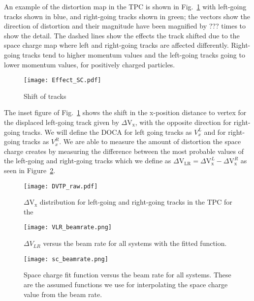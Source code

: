 An example of the distortion map in the TPC is shown in Fig.~\ref{fig:sc_shift} with left-going tracks shown in blue, and right-going tracks shown in green; the vectors show the direction of distortion and their magnitude have been magnified by ??? times to show the detail. The dashed lines show the effects the track shifted due to the space charge map where left and right-going tracks are affected differently. Right-going tracks tend to higher momentum values and the left-going tracks going to lower momentum values, for positively charged particles. 

\begin{figure}[!htb]
\texttt{[image: Effect\_SC.pdf]}
\caption{Shift of tracks}
\label{fig:sc_shift}
\end{figure}

The inset figure of Fig.~\ref{fig:sc_shift} shows the shift in the x-position distance to vertex for the displaced left-going track given by $\Delta\mathrm{V}_\mathrm{x}$, with the opposite direction for right-going tracks. We will define the DOCA for left going tracks as $V_x^L$ and for right-going tracks as $V_x^R$. We are able to measure the amount of distortion the space charge creates by measuring the difference between the most probable values of the left-going and right-going tracks which we define as $\Delta\mathrm{V}_\mathrm{LR} = \Delta\mathrm{V}_\mathrm{x}^L - \Delta\mathrm{V}_\mathrm{x}^R$ as seen in Figure~\ref{fig:VLR}.

\begin{figure}[H]
\texttt{[image: DVTP\_raw.pdf]}
\caption{$\Delta\mathrm{V}_\mathrm{x}$ distribution for left-going and right-going tracks in the TPC for the }
\label{fig:VLR}
\end{figure}


\begin{figure}[!htb]
\texttt{[image: VLR\_beamrate.png]}
\caption{ $\Delta V_{LR}$ versus the beam rate for all systems with the fitted function.}
\label{fig:vlr_br}
\end{figure}



\begin{figure}[!htb]
\texttt{[image: sc\_beamrate.png]}
\caption{Space charge fit function versus the beam rate for all systems. These are the assumed functions we use for interpolating the space charge value from the beam rate.}
\label{fig:spacechg_br_all}
\end{figure}


